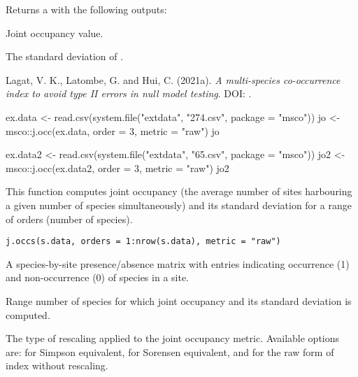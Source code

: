\documentclass[a4paper]{book}
\begin{document}
%
\begin{Value}
Returns a  with the following outputs:
\begin{ldescription}
\item[\code{jo.val}] Joint occupancy value.
\item[\code{jo.sd}] The standard deviation of .
\end{ldescription}
\end{Value}
%
\begin{References}\relax
Lagat, V. K., Latombe, G. and Hui, C. (2021a). \emph{A multi-species co-occurrence
index to avoid type II errors in null model testing}. DOI: .
\end{References}
%
\begin{Examples}
\begin{ExampleCode}
ex.data <- read.csv(system.file("extdata", "274.csv", package = "msco"))
jo <- msco::j.occ(ex.data, order = 3, metric = "raw")
jo

ex.data2 <- read.csv(system.file("extdata", "65.csv", package = "msco"))
jo2 <- msco::j.occ(ex.data2, order = 3, metric = "raw")
jo2
\end{ExampleCode}
\end{Examples}
%
\begin{Description}\relax
This function computes joint occupancy (the average number of sites harbouring a
given number of  species simultaneously) and its standard deviation for a
range of orders (number of species).
\end{Description}
%
\begin{Usage}
\begin{verbatim}
j.occs(s.data, orders = 1:nrow(s.data), metric = "raw")
\end{verbatim}
\end{Usage}
%
\begin{Arguments}
\begin{ldescription}
\item[\code{s.data}] A species-by-site presence/absence matrix with entries indicating
occurrence (1) and non-occurrence (0) of species in a site.

\item[\code{orders}] Range number of species for which joint occupancy and its standard
deviation is computed.

\item[\code{metric}] The type of rescaling applied to the joint occupancy metric. Available options are:
 for Simpson equivalent,  for Sorensen equivalent, and  for the
raw form of index without rescaling.
\end{ldescription}
\end{Arguments}
\end{document}
